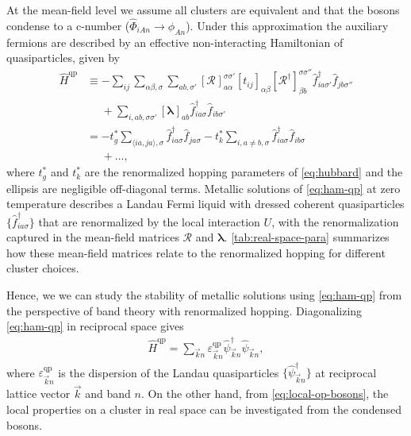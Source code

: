 \documentclass[reprint,aps,prb,amsmath,amssymb]{revtex4-2}
\begin{document}
At the mean-field level we assume all clusters are equivalent and that the bosons condense to a c-number ($\hat{\Phi}_{iAn} \rightarrow \phi_{An}$). Under this approximation the auxiliary fermions are described by an effective non-interacting Hamiltonian of quasiparticles, given by
%
\begin{align} \label{eq:ham-qp}
	\hat{H}^{\mathrm{qp}} &\equiv -\sum_{ij} \sum_{\alpha\beta,\sigma} \sum_{ab,\sigma'} [\bm{\mathcal{R}}^{}]_{a\alpha}^{\sigma\sigma'} [t_{ij}]_{\alpha\beta}  [\bm{\mathcal{R}}^{\dagger}]_{\beta b}^{\sigma \sigma''} \hat{f}_{ia\sigma'}^{\dagger} \hat{f}_{jb\sigma''}^{} \nonumber \\
	& \phantom{{}\equiv} + \sum_{i,ab,\sigma\sigma'} [\bm{\lambda}^{}]_{ab}^{} \hat{f}_{ia\sigma}^{\dagger} \hat{f}_{ib\sigma'}^{} \nonumber \\
	& = -t_g^* \sum_{\langle ia,ja \rangle,\sigma} \hat{f}_{ia\sigma}^{\dagger} \hat{f}_{ja\sigma}^{} - t_k^* \sum_{i,a\neq b,\sigma} \hat{f}_{ia\sigma}^{\dagger} \hat{f}_{ib\sigma}^{} \nonumber \\
	& \phantom{=} + \ldots,
\end{align}
%
where $t_g^*$ and $t_k^*$ are the renormalized hopping parameters of \cref{eq:hubbard} and the ellipsis are negligible off-diagonal terms.
%
Metallic solutions of \cref{eq:ham-qp} at zero temperature describes a Landau Fermi liquid with dressed coherent quasiparticles $\{\hat{f}_{ia\sigma}^{\dagger}\}$ that are renormalized by the local interaction $U$, with the renormalization captured in the mean-field matrices $\bm{\mathcal{R}}$ and $\bm{\lambda}$. \cref{tab:real-space-para} summarizes how these mean-field matrices relate to the renormalized hopping for different cluster choices.

Hence, we we can study the stability of metallic solutions using \cref{eq:ham-qp} from the perspective of band theory with renormalized hopping. Diagonalizing \cref{eq:ham-qp} in reciprocal space gives
%
\begin{align} \label{eq:qp-bands}
\hat{H}^{\mathrm{qp}} = \sum_{\vec{k}n} \varepsilon_{\vec{k}n}^{\mathrm{qp}} \hat{\psi}_{\vec{k}n}^{\dagger} \hat{\psi}_{\vec{k}n}^{},
\end{align}
%
where $\varepsilon_{\vec{k}n}^{\mathrm{qp}}$ is the dispersion of the Landau quasiparticles $\{ \hat{\psi}_{\vec{k}n}^{\dagger} \}$ at reciprocal lattice vector $\vec{k}$ and band $n$. On the other hand, from \cref{eq:local-op-bosons}, the local properties on a cluster in real space can be investigated from the condensed bosons.
\end{document}

